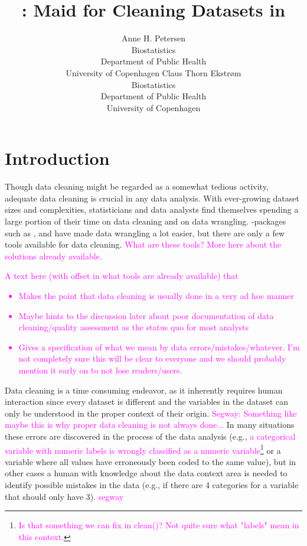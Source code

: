 \documentclass[article]{jss}
\author{Anne H. Petersen\\Biostatistics\\Department of Public
  Health\\University of Copenhagen \And Claus Thorn Ekstr\o m\\Biostatistics\\Department of Public
  Health\\University of Copenhagen}
\title{\pkg{cleanR}: Maid for Cleaning Datasets in \proglang{R}}
\newcommand{\hl}[1]{\textcolor{magenta}{#1}}
\begin{document}
\section{Introduction}
Though data cleaning might be regarded as a somewhat tedious activity,
adequate data cleaning is crucial in any data analysis. With
ever-growing dataset sizes and complexities, statisticians and data
analysts find themselves spending a large portion of their time on
data cleaning and on data wrangling. -packages such as
, and  have made data wrangling a lot
easier, but there are only a few tools available for data
cleaning. \hl{What are these tools? More here about the solutions
  already available.}



\hl{A text here (with offset in what tools are already available) that
\begin{itemize}
\item Makes the point that data cleaning is usually done in a very ad hoc manner
\item Maybe hints to the discussion later about poor documentation of data cleaning/quality assessment as the status quo for most analysts
\item Gives a specification of what we mean by data errors/mistakes/whatever. I'm not completely sure this will be clear to everyone and we should probably mention it early on to not lose readers/users.
\end{itemize}
}

Data cleaning is a time consuming endeavor, as it inherently requires
human interaction since every dataset is different and the variables
in the dataset can only be understood in the proper context of their origin. 
\hl{Segway: Something like maybe this is why proper data cleaning is not always done...}
In many situations these errors are discovered in the process of the
data analysis (e.g., \hl{a categorical variable with numeric labels is
wrongly classified as a numeric variable\footnote{\hl{Is that something we can fix in clean()? Not quite sure what "labels" mean in this context.}}} or a variable where all values have erroneously been coded to the same value), but in other cases a human
with knowledge about the data context area is needed to identify
possible mistakes in the data (e.g., if there are 4 categories for a
variable that should only have 3).  \hl{segway} \\
\end{document}
